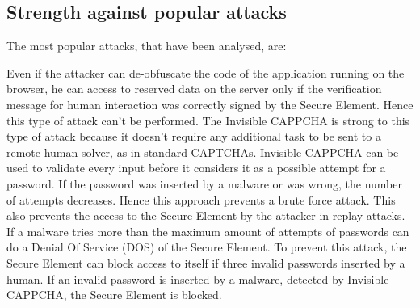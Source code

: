 \subsection{Strength against popular attacks}
The most popular attacks, that have been analysed, are\cite{Invisible_CAPPCHA}:
\begin{itemize}
{
}
{Even if the attacker can de-obfuscate the code of the application running on the browser, he can access to reserved data on the server only if the verification message for human interaction was correctly signed by the Secure Element. Hence this type of attack can't be performed.}
{The Invisible CAPPCHA is strong to this type of attack because it doesn't require any additional task to be sent to a remote human solver, as in standard CAPTCHAs.}
{Invisible CAPPCHA can be used to validate every input before it considers it as a possible attempt for a password. If the password was inserted by a malware or was wrong, the number of attempts decreases. Hence this approach prevents a brute force attack. This also prevents the access to the Secure Element by the attacker in replay attacks.
}
{If a malware tries more than the maximum amount of attempts of passwords can do a Denial Of Service (DOS) of the Secure Element. To prevent this attack, the Secure Element can block access to itself if three invalid passwords inserted by a human. If an invalid password is inserted by a malware, detected by Invisible CAPPCHA, the Secure Element is blocked.}
\end{itemize}